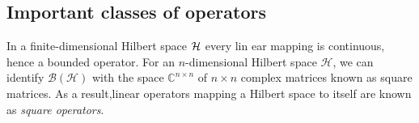  

\subsection{Important classes of operators}

 In a finite-dimensional Hilbert space $\mathcal{H}$ every lin ear mapping is continuous, hence a bounded operator. 
For an $n$-dimensional Hilbert space $\mathcal{H}$, we can identify $\mathcal{B}(\mathcal{H})$ with the space $\mathbb{C}^{n\times n}$ of $n \times n$ complex matrices known as square matrices. As a result,linear operators mapping a Hilbert space to itself are known as \emph{square operators}. %

